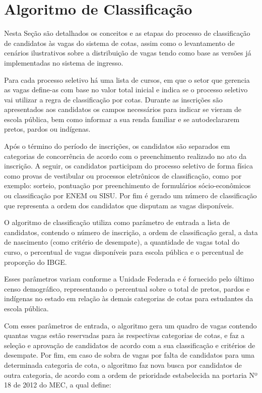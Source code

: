 \section{Algoritmo de Classificação}
\label{algoritimodeclassificacao}

Nesta Seção são detalhados os conceitos e as etapas do processo de classificação de candidatos às vagas do sistema de cotas, assim como o levantamento de cenários ilustrativos sobre a distribuição de vagas tendo como base as versões já implementadas no sistema de ingresso.

Para cada processo seletivo há uma lista de cursos, em que o setor que gerencia as vagas define-as com base no valor total inicial e indica se o processo seletivo vai utilizar a regra de classificação por cotas. Durante as inscrições são apresentados aos candidatos os campos necessários para indicar se vieram de escola pública, bem como informar a sua renda familiar e se autodeclararem pretos, pardos ou indígenas.

Após o término do período de inscrições, os candidatos são separados em categorias de concorrência de acordo com o preenchimento realizado no ato da inscrição. A seguir, os candidatos participam do processo seletivo de forma física como provas de vestibular ou processos eletrônicos de classificação, como por exemplo: sorteio, pontuação por preenchimento de formulários sócio-econômicos ou classificação por \gls{ENEM} ou \gls{SISU}. Por fim é gerado um número de classificação que representa a ordem dos candidatos que disputam as vagas disponíveis.

O algoritmo de classificação utiliza como parâmetro de entrada a lista de candidatos, contendo o número de inscrição, a ordem de classificação geral, a data de nascimento (como critério de desempate), a quantidade de vagas total do curso, o percentual de vagas disponíveis para escola pública e o percentual de proporção do \gls{IBGE}.

Esses parâmetros variam conforme a Unidade Federada e é fornecido pelo último censo demográfico, representando o percentual sobre o total de pretos, pardos e indígenas no estado em relação às demais categorias de cotas para estudantes da escola pública.

Com esses parâmetros de entrada, o algoritmo gera um quadro de vagas contendo quantas vagas estão reservadas para às respectivas categorias de cotas, e faz a seleção e aprovação de candidatos de acordo com a sua classificação e critérios de desempate. Por fim, em caso de sobra de vagas por falta de candidatos para uma determinada categoria de cota, o algoritmo faz nova busca por candidatos de outra categoria, de acordo com a ordem de prioridade estabelecida na portaria Nº 18 de 2012 do \gls{MEC}, a qual define:

